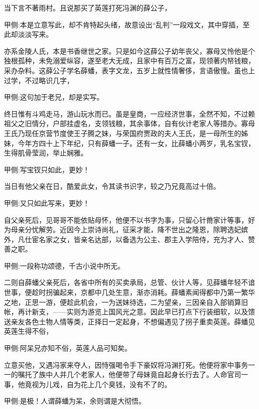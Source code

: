 \begin{parag}
    当下言不著雨村。且说那买了英莲打死冯渊的薛公子，\begin{note}甲侧:本是立意写此，却不肯特起头绪，故意设出“乱判”一段戏文，其中穿插，至此却淡淡写来。\end{note}亦系金陵人氏，本是书香继世之家。只是如今这薛公子幼年丧父，寡母又怜他是个独根孤种，未免溺爱纵容，遂至老大无成，且家中有百万之富，现领著内帑钱粮，采办杂料。这薛公子学名薛蟠，表字文龙，五岁上就性情奢侈，言语傲慢。虽也上过学，不过略识几字，\begin{note}甲侧:这句加于老兄，却是实写。\end{note}终日惟有斗鸡走马，游山玩水而已。虽是皇商，一应经济世事，全然不知，不过赖祖父之旧情分，户部挂虚名，支领钱粮，其余事体，自有伙计老家人等措办。寡母王氏乃现任京营节度使王子腾之妹，与荣国府贾政的夫人王氏，是一母所生的姊妹，今年方四十上下年纪，只有薛蟠一子。还有一女，比薛蟠小两岁，乳名宝钗，生得肌骨莹润，举止娴雅。\begin{note}甲侧:写宝钗只如此，更妙！\end{note}当日有他父亲在日，酷爱此女，令其读书识字，较之乃兄竟高过十倍。\begin{note}甲侧:又只如此写来，更妙！\end{note}自父亲死后，见哥哥不能依贴母怀，他便不以书字为事，只留心针黹家计等事，好为母亲分忧解劳。近因今上崇诗尚礼，征采才能，降不世出之隆恩，除聘选妃嫔外，凡仕宦名家之女，皆亲名达部，以备选为公主、郡主入学陪侍，充为才人、赞善之职。\begin{note}甲侧:一段称功颂德，千古小说中所无。\end{note}二则自薛蟠父亲死后，各省中所有的买卖承局，总管、伙计人等，见薛蟠年轻不谙世事，便趁时拐骗起来，京都中几处生意，渐亦消耗。薛蟠素闻得都中乃第一繁华之地，正思一游，便趁此机会，一为送妹待选，二为望亲，三因亲自入部销算旧帐，再计新支，——实则为游览上国风光之意。因此早已打点下行装细软，以及馈送亲友各色土物人情等类，正择日一定起身，不想偏遇见了拐子重卖英莲。薛蟠见英莲生得不俗，\begin{note}甲侧:阿呆兄亦知不俗，英莲人品可知矣。\end{note}立意买他，又遇冯家来夺人，因恃强喝令手下豪奴将冯渊打死。他便将家中事务一一的嘱托了族中人并几个老家人，他便带了母妹竟自起身长行去了。人命官司一事，他竟视为儿戏，自为花上几个臭钱，没有不了的。\begin{note}甲侧:是极！人谓薛蟠为呆，余则谓是大彻悟。\end{note}
\end{parag}



